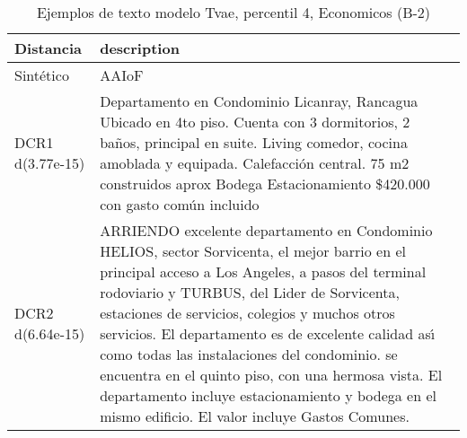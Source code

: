 \begin{table}[H]
\centering
\fontsize{10}{14}\selectfont
\caption{Ejemplos de texto modelo Tvae, percentil 4, Economicos (B-2)}
\label{table-example-economicos-b-2-tvae-4p-text}
\begin{tabular}{|l|m{35em}|}
\hline
\rowcolor[gray]{0.8}
Distancia & description \\
\hline Sintético & AAIoF \\
\hline DCR1 d(3.77e-15) & Departamento en Condominio Licanray, Rancagua
Ubicado en 4to piso.
Cuenta con 3 dormitorios, 2 ba\~nos, principal en suite.
Living comedor, cocina amoblada y equipada.
Calefacci\'on central.
75 m2 construidos aprox
Bodega
Estacionamiento
\$420.000 con gasto com\'un incluido \\
\hline DCR2 d(6.64e-15) & ARRIENDO excelente departamento en Condominio HELIOS, sector Sorvicenta, el mejor barrio en el principal acceso a Los Angeles, a pasos del terminal rodoviario y TURBUS, del Lider de Sorvicenta, estaciones de servicios, colegios y muchos otros servicios. El departamento es de excelente calidad as{\'\i} como todas las instalaciones del condominio.  se encuentra en el quinto piso, con una hermosa vista.  El departamento incluye estacionamiento y bodega en el mismo edificio.  El valor incluye Gastos Comunes. \\
\hline
\end{tabular}
\end{table}
